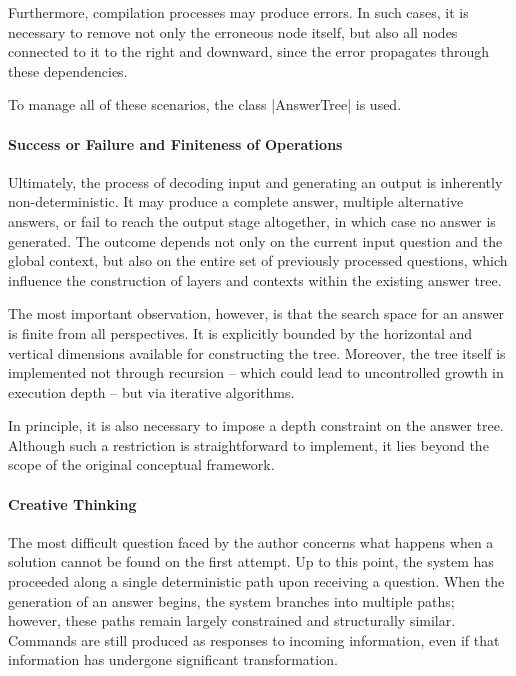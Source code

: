 \documentclass[12pt, a4paper]{article}
\begin{document}
Furthermore, compilation processes may produce errors. In such cases, it is necessary to remove 
not only the erroneous node itself, but also all nodes connected to it to the right and downward, 
since the error propagates through these dependencies.

To manage all of these scenarios, the class |AnswerTree| is used.

\paragraph{Success or Failure and Finiteness of Operations}

Ultimately, the process of decoding input and generating an output is inherently 
non-deterministic. It may produce a complete answer, multiple alternative answers, 
or fail to reach the output stage altogether, in which case no answer is generated. 
The outcome depends not only on the current input question and the global context, 
but also on the entire set of previously processed questions, which influence the 
construction of layers and contexts within the existing answer tree.

The most important observation, however, is that the search space for an answer is 
finite from all perspectives. It is explicitly bounded by the horizontal and vertical 
dimensions available for constructing the tree. Moreover, the tree itself is implemented 
not through recursion -- which could lead to uncontrolled growth in execution depth -- but 
via iterative algorithms.

In principle, it is also necessary to impose a depth constraint on the answer tree. Although 
such a restriction is straightforward to implement, it lies beyond the scope of the original 
conceptual framework.

\paragraph{Creative Thinking}

The most difficult question faced by the author concerns what happens when a solution cannot 
be found on the first attempt. Up to this point, the system has proceeded along a single 
deterministic path upon receiving a question. When the generation of an answer begins, the 
system branches into multiple paths; however, these paths remain largely constrained and 
structurally similar. Commands are still produced as responses to incoming information, 
even if that information has undergone significant transformation.
\end{document}
